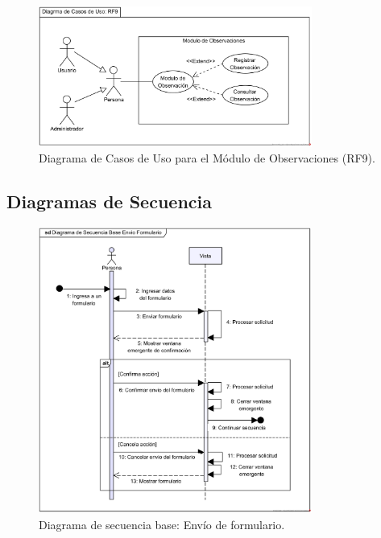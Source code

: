\begin{figure}[H]
    \centering
    \caption{Diagrama de Casos de Uso para el Módulo de Observaciones (RF9).}
    \label{fig:casos-uso-observaciones}
    \includegraphics[width=0.8\textwidth]{UML/CasosUso/Diagrama de Casos de Uso RF9.png}
\end{figure}


\subsection{Diagramas de Secuencia}


\begin{figure}[H]
    \centering
    \caption{Diagrama de secuencia base: Envío de formulario.}
    \includegraphics[width=0.8\textwidth]{UML/Secuencia/Diagrama de Secuencia Base Envio Formulario.png}
\end{figure}



